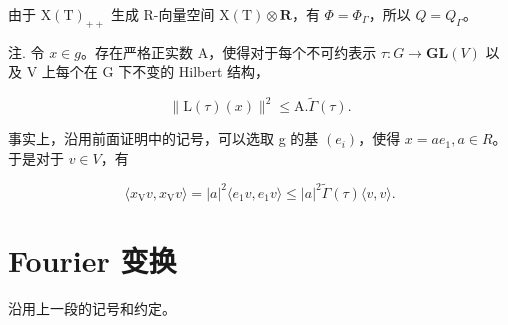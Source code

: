 由于 \(\mathrm{X(T)_{++}}\) 生成 R-向量空间 \(\mathrm{X(T)}\otimes\mathbf{R}\)，有 \(\Phi=\Phi_{\Gamma}\)，所以 \(Q=Q_{\Gamma}\)。

注. 令 \(x \in g\)。存在严格正实数 A，使得对于每个不可约表示 \(\tau : G \to \mathbf{GL}(V)\) 以及 V 上每个在 G 下不变的 Hilbert 结构，

\[
\| \mathrm{L} (\tau) (x) \| ^ {2} \leq \mathrm{A}. \tilde {\Gamma} (\tau).
\]

事实上，沿用前面证明中的记号，可以选取 g 的基 \((e_{i})\)，使得 \(x = ae_{1}, a \in R\)。于是对于 \(v \in V\)，有

\[
\langle x _ {\mathrm{V}} v, x _ {\mathrm{V}} v \rangle = | a | ^ {2} \langle e _ {1} v, e _ {1} v \rangle \leq | a | ^ {2} \tilde {\Gamma} (\tau) \langle v, v \rangle .
\]

\section{Fourier 变换}

沿用上一段的记号和约定。